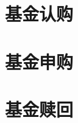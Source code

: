 
\section{基金认购} 
\label{sec:trade_fund_rebuy}


\section{基金申购} 
\label{sec:trade_fund_buy}


\section{基金赎回} 
\label{sec:trade_fund_redemp}

